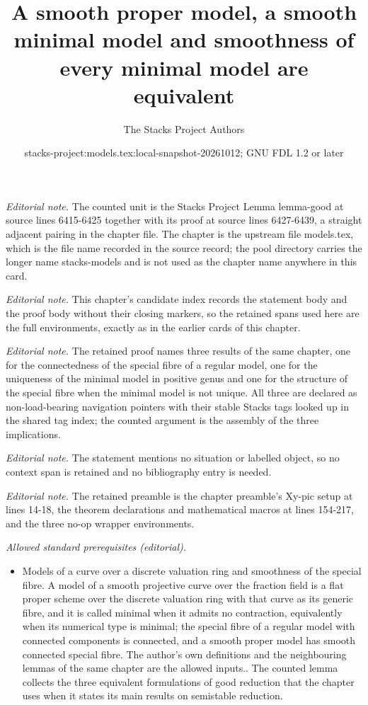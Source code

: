 \documentclass[10pt,a4paper]{amsart}
\title{A smooth proper model, a smooth minimal model and smoothness of every minimal model are equivalent}
\author{The Stacks Project Authors}
\date{stacks-project:models.tex:local-snapshot-20261012; GNU FDL 1.2 or later}
\theoremstyle{plain}
\theoremstyle{definition}
\theoremstyle{remark}
\numberwithin{equation}{subsection}
\begin{document}
\maketitle
\noindent\textit{Editorial note.} The counted unit is the Stacks Project Lemma lemma-good at source lines 6415-6425 together with its proof at source lines 6427-6439, a straight adjacent pairing in the chapter file. The chapter is the upstream file models.tex, which is the file name recorded in the source record; the pool directory carries the longer name stacks-models and is not used as the chapter name anywhere in this card.\par\medskip
\noindent\textit{Editorial note.} This chapter's candidate index records the statement body and the proof body without their closing markers, so the retained spans used here are the full environments, exactly as in the earlier cards of this chapter.\par\medskip
\noindent\textit{Editorial note.} The retained proof names three results of the same chapter, one for the connectedness of the special fibre of a regular model, one for the uniqueness of the minimal model in positive genus and one for the structure of the special fibre when the minimal model is not unique. All three are declared as non-load-bearing navigation pointers with their stable Stacks tags looked up in the shared tag index; the counted argument is the assembly of the three implications.\par\medskip
\noindent\textit{Editorial note.} The statement mentions no situation or labelled object, so no context span is retained and no bibliography entry is needed.\par\medskip
\noindent\textit{Editorial note.} The retained preamble is the chapter preamble's Xy-pic setup at lines 14-18, the theorem declarations and mathematical macros at lines 154-217, and the three no-op wrapper environments.\par\medskip
\noindent\textit{Allowed standard prerequisites (editorial).}\begin{itemize}
\item Models of a curve over a discrete valuation ring and smoothness of the special fibre. A model of a smooth projective curve over the fraction field is a flat proper scheme over the discrete valuation ring with that curve as its generic fibre, and it is called minimal when it admits no contraction, equivalently when its numerical type is minimal; the special fibre of a regular model with connected components is connected, and a smooth proper model has smooth connected special fibre. The author's own definitions and the neighbouring lemmas of the same chapter are the allowed inputs.. The counted lemma collects the three equivalent formulations of good reduction that the chapter uses when it states its main results on semistable reduction.
\end{itemize}\medskip
\end{document}
